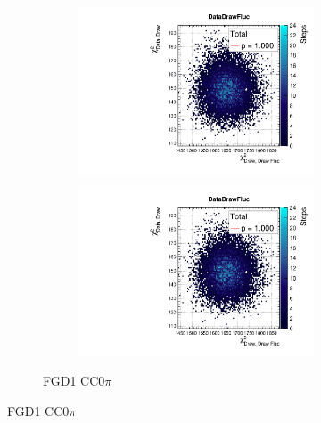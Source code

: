 \begin{figure}[h]
	\begin{subfigure}[t]{\textwidth}
	\begin{subfigure}[t]{0.49\textwidth}
		\includegraphics[width=\textwidth, trim={0mm 10mm 0mm 11mm}, clip,page=5]{figures/mach3/Asimov/2017b_NewDet_3Xsec_4Det_5Flux_NewXSecTune_Asimov_merge_PostPred_procs}
	\end{subfigure}
	\begin{subfigure}[t]{0.49\textwidth}
		\includegraphics[width=\textwidth, trim={0mm 10mm 0mm 11mm}, clip,page=7]{figures/mach3/Asimov/2017b_NewDet_3Xsec_4Det_5Flux_NewXSecTune_Asimov_merge_PostPred_procs}
	\end{subfigure}
\caption{FGD1 CC0$\pi$}
\end{subfigure}


\end{figure}

